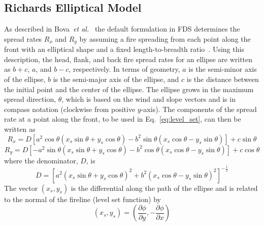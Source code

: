 \subsection{Richards Elliptical Model}

As described in Bova~\textit{et al.}~\cite{Bova:IJWF2015} the default formulation in FDS determines the spread rates $R_x$ and $R_y$ by assuming a fire spreading from each point along the front with an elliptical shape and a fixed length-to-breadth ratio~\cite{Richards:1990}. Using this description, the head, flank, and back fire spread rates for an ellipse are written as $b+c$, $a$, and $b-c$, respectively. In terms of geometry, $a$ is the semi-minor axis of the ellipse, $b$ is the semi-major axis of the ellipse, and $c$ is the distance between the initial point and the center of the ellipse. The ellipse grows in the maximum spread direction, $\theta$, which is based on the wind and slope vectors and is in compass notation (clockwise from positive $y$-axis). The components of the spread rate at a point along the front, to be used in Eq.~\ref{eq:level_set}, can then be written as
\begin{equation}
R_{x} = D\left[a^{2} \cos \theta\left(x_{s} \sin \theta+y_{s} \cos \theta\right)-b^{2} \sin \theta\left(x_{s} \cos \theta - 
y_{s} \sin \theta\right)\right]+ c \sin \theta
\end{equation}
\begin{equation}
R_{y} = D\left[-a^{2} \sin \theta\left(x_{s} \sin \theta+y_{s} \cos \theta\right)-b^{2} \cos \theta\left(x_{s} \cos \theta - 
y_{s} \sin \theta\right)\right]+c \cos \theta
\end{equation}
where the denominator, $D$, is
\begin{equation}
D = \left[a^{2}\left(x_{s} \sin \theta+y_{s} \cos \theta\right)^{2}+b^{2}\left(x_{s} \cos \theta-y_{s} \sin \theta\right)^{2}\right]^{-\frac{1}{2}}
\end{equation}
The vector $(x_s,y_s)$ is the differential along the path of the ellipse and is related to the normal of the fireline (level set function) by
\begin{equation}
(x_s,y_s) = \left(\frac{\partial\phi}{\partial y}, -\frac{\partial\phi}{\partial x} \right)
\end{equation}

